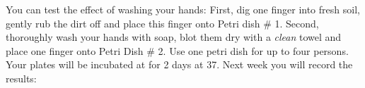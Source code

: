 You can test the effect of washing your hands: First, dig one finger into fresh soil, gently rub the dirt off and place this finger onto Petri dish \# 1. Second, thoroughly wash your hands with soap, blot them dry with a \emph{clean} towel and place one finger onto Petri Dish \# 2. Use one petri dish for up to four persons. Your plates will be incubated at for 2 days at 37\degreecelsius. Next week you will record the results:







